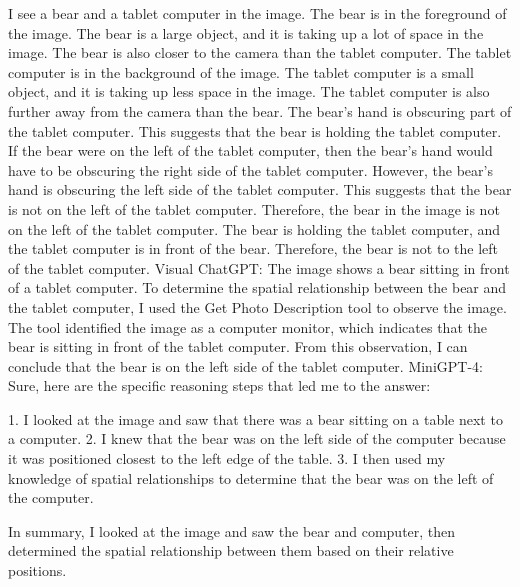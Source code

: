 \begin{enumerate}
    I see a bear and a tablet computer in the image.
    The bear is in the foreground of the image. The bear is a large object, and it is taking up a lot of space in the image. The bear is also closer to the camera than the tablet computer.
    The tablet computer is in the background of the image. The tablet computer is a small object, and it is taking up less space in the image. The tablet computer is also further away from the camera than the bear.
    The bear's hand is obscuring part of the tablet computer. This suggests that the bear is holding the tablet computer.
    If the bear were on the left of the tablet computer, then the bear's hand would have to be obscuring the right side of the tablet computer. However, the bear's hand is obscuring the left side of the tablet computer. This suggests that the bear is not on the left of the tablet computer.
    Therefore, the bear in the image is not on the left of the tablet computer. The bear is holding the tablet computer, and the tablet computer is in front of the bear. Therefore, the bear is not to the left of the tablet computer.
    \subitem Visual ChatGPT: The image shows a bear sitting in front of a tablet computer. To determine the spatial relationship between the bear and the tablet computer, I used the Get Photo Description tool to observe the image. The tool identified the image as a computer monitor, which indicates that the bear is sitting in front of the tablet computer. From this observation, I can conclude that the bear is on the left side of the tablet computer.
    \subitem MiniGPT-4: Sure, here are the specific reasoning steps that led me to the answer:

    1. I looked at the image and saw that there was a bear sitting on a table next to a computer.
    2. I knew that the bear was on the left side of the computer because it was positioned closest to the left edge of the table.
    3. I then used my knowledge of spatial relationships to determine that the bear was on the left of the computer.
    
    In summary, I looked at the image and saw the bear and computer, then determined the spatial relationship between them based on their relative positions.
\end{enumerate}
